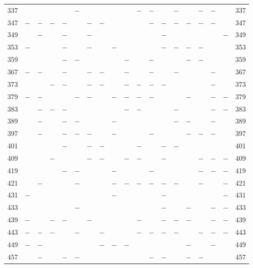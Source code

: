 \begin{center}
\begin{tabular}{r|c|c|c|c|c|c|c|c|c|c|c|c|c|c|c|c|c|r}
337 &  &  &  &  & $-$ &  &  &  &  & $-$ & $-$ &  & $-$ &  & $-$ & $-$ &  & 337\\
347 & $-$ & $-$ & $-$ & $-$ &  & $-$ & $-$ &  &  &  & $-$ & $-$ & $-$ & $-$ & $-$ & $-$ &  & 347\\
349 &  & $-$ &  & $-$ &  & $-$ &  &  &  &  &  & $-$ &  &  &  &  & $-$ & 349\\
353 & $-$ &  &  & $-$ &  & $-$ &  & $-$ &  &  &  & $-$ & $-$ & $-$ & $-$ &  &  & 353\\
359 &  &  &  & $-$ & $-$ &  &  &  & $-$ &  & $-$ &  &  & $-$ & $-$ &  &  & 359\\
367 & $-$ & $-$ &  & $-$ &  & $-$ & $-$ &  & $-$ &  & $-$ &  & $-$ &  &  & $-$ &  & 367\\
373 &  &  & $-$ & $-$ &  & $-$ & $-$ &  & $-$ & $-$ & $-$ & $-$ &  &  &  & $-$ &  & 373\\
379 & $-$ & $-$ &  &  & $-$ & $-$ &  & $-$ & $-$ & $-$ & $-$ &  &  & $-$ &  & $-$ & $-$ & 379\\
383 &  & $-$ & $-$ & $-$ &  &  &  &  & $-$ & $-$ &  &  & $-$ &  &  & $-$ & $-$ & 383\\
389 &  & $-$ &  & $-$ & $-$ &  &  & $-$ &  &  &  &  & $-$ & $-$ &  & $-$ &  & 389\\
397 &  & $-$ &  & $-$ & $-$ & $-$ &  & $-$ &  &  & $-$ &  &  & $-$ & $-$ & $-$ &  & 397\\
401 &  &  &  & $-$ &  & $-$ & $-$ &  &  & $-$ &  & $-$ & $-$ &  &  &  &  & 401\\
409 &  &  & $-$ &  &  & $-$ & $-$ &  & $-$ & $-$ &  & $-$ &  &  & $-$ & $-$ & $-$ & 409\\
419 &  &  &  & $-$ & $-$ &  &  & $-$ &  &  & $-$ &  &  &  & $-$ & $-$ & $-$ & 419\\
421 &  & $-$ &  &  & $-$ &  &  & $-$ & $-$ & $-$ & $-$ & $-$ & $-$ &  & $-$ &  & $-$ & 421\\
431 & $-$ &  &  &  &  &  &  & $-$ &  &  &  & $-$ &  &  &  &  & $-$ & 431\\
433 &  &  &  &  & $-$ &  &  &  &  &  &  & $-$ &  & $-$ &  & $-$ & $-$ & 433\\
439 & $-$ &  & $-$ & $-$ &  & $-$ &  &  &  & $-$ &  & $-$ & $-$ & $-$ &  & $-$ & $-$ & 439\\
443 & $-$ & $-$ & $-$ &  & $-$ &  & $-$ &  &  & $-$ & $-$ & $-$ & $-$ &  & $-$ & $-$ & $-$ & 443\\
449 & $-$ & $-$ &  &  &  &  & $-$ & $-$ & $-$ &  &  &  &  & $-$ &  & $-$ &  & 449\\
457 &  & $-$ &  & $-$ & $-$ &  &  &  &  &  & $-$ & $-$ &  & $-$ & $-$ &  &  & 457\\

\end{tabular}
\end{center}
